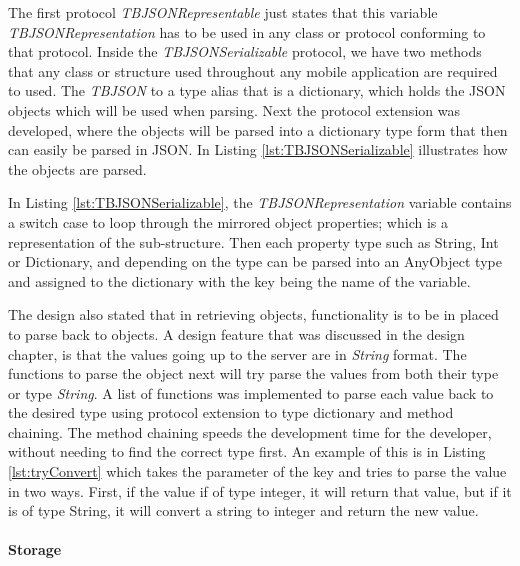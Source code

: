 

The first protocol \textit{TBJSONRepresentable} just states that this variable \textit{TBJSONRepresentation} has to be used in any class or protocol conforming to that protocol. Inside the \textit{TBJSONSerializable} protocol, we have two methods that any class or structure used throughout any mobile application are required to used. The \textit{TBJSON} to a type alias that is a dictionary, which holds the JSON objects which will be used when parsing. Next the protocol extension was developed, where the objects will be parsed into a dictionary type form that then can easily be parsed in JSON. In Listing \ref{lst:TBJSONSerializable} illustrates how the objects are parsed.



In Listing \ref{lst:TBJSONSerializable}, the \textit{TBJSONRepresentation} variable contains a switch case to loop through the mirrored object properties; which is a representation of the sub-structure. Then each property type such as String, Int or Dictionary, and depending on the type can be parsed into an AnyObject type and assigned to the dictionary with the key being the name of the variable.

The design also stated that in retrieving objects, functionality is to be in placed to parse back to objects. A design feature that was discussed in the design chapter, is that the values going up to the server are in \textit{String} format. The functions to parse the object next will try parse the values from both their type or type \textit{String}. A list of functions was implemented to parse each value back to the desired type using protocol extension to type dictionary and method chaining. The method chaining speeds the development time for the developer, without needing to find the correct type first. An example of this is in Listing \ref{lst:tryConvert} which takes the parameter of the key and tries to parse the value in two ways. First, if the value if of type integer, it will return that value, but if it is of type String, it will convert a string to integer and return the new value.



\paragraph{Storage}

